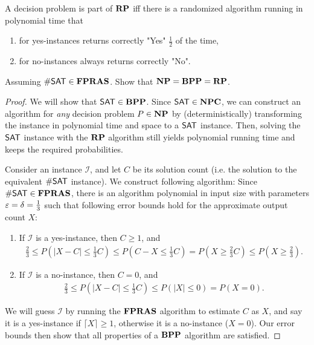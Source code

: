 \begin{aufgabe}
 \begin{definition}
     A decision problem is part of $\mathbf{RP}$ iff there is a randomized algorithm running in polynomial time that
     \begin{enumerate}
         \item for yes-instances returns correctly "Yes" $\frac{1}{2}$ of the time,
         \item for no-instances always returns correctly "No".
     \end{enumerate}
 \end{definition}
 Assuming $\mathsf{\#SAT} \in \mathbf{FPRAS}$. Show that $\mathbf{NP} = \mathbf{BPP} = \mathbf{RP}$.
 \begin{proof}
    We will show that $\mathsf{SAT} \in \mathbf{BPP}$. Since $\mathsf{SAT} \in \mathbf{NPC}$, we can construct an algorithm for \emph{any} decision problem $P \in \mathbf{NP}$ by (deterministically) transforming the instance in polynomial time and space to a $\mathsf{SAT}$ instance. 
    Then, solving the $\mathsf{SAT}$ instance with the $\mathbf{RP}$ algorithm still yields polynomial running time and keeps the required probabilities.

    Consider an instance $\mathcal I$, and let $C$ be its solution count (i.e. the solution to the equivalent $\mathsf{\#SAT}$ instance).
    We construct following algorithm: 
    Since $\mathsf{\#SAT} \in \mathbf{FPRAS}$, there is an algorithm polynomial in input size with parameters $\varepsilon = \delta = \frac{1}{3}$ such that following error bounds hold for the approximate output count $X$:
    \begin{enumerate}
        \item If $\mathcal I$ is a yes-instance, then $C \geq 1$, and 
        \begin{align*}
            \frac{2}{3}  \leq  P(|X - C| \leq \frac{1}{3}C)   \leq P(C - X \leq \frac{1}{3}C) = P(X \geq \frac{2}{3}C)  \leq P(X \geq \frac{2}{3}).
        \end{align*}
        \item If $\mathcal I$ is a no-instance, then $C = 0$, and 
        \begin{align*}
            \frac{2}{3}  \leq  P(|X - C| \leq \frac{1}{3}C)  \leq P(|X| \leq 0) = P(X = 0).
        \end{align*}
    \end{enumerate}
    We will guess $\mathcal I$ by running the $\mathbf{FPRAS}$ algorithm to estimate $C$ as $X$, and say it is a yes-instance if $\lceil X \rceil \geq 1$, otherwise it is a no-instance ($X=0$). Our error bounds then show that all properties of a $\mathbf{BPP}$ algorithm are satisfied.


\end{proof}
\end{aufgabe}
